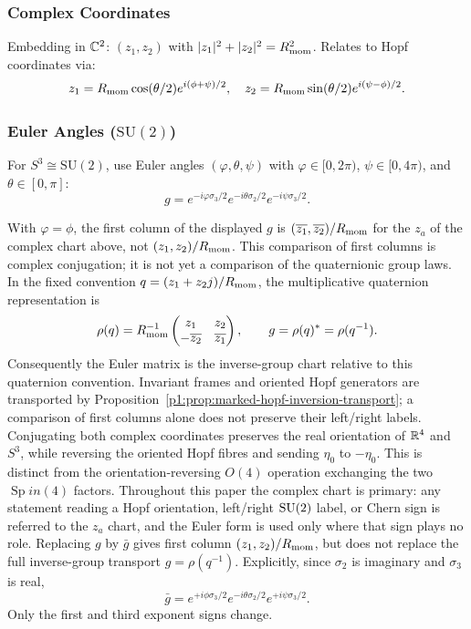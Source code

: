 \documentclass[11pt]{article}
\begin{document}
\subsubsection{Complex Coordinates}
Embedding in $\mathbb{C}^2$: $(z_1, z_2)$ with $|z_1|^2 + |z_2|^2 = R_{\mathrm{mom}}^2$. Relates to Hopf coordinates via:
\[
z_1 = R_{\mathrm{mom}}\cos(\theta/2)e^{i(\phi+\psi)/2}, \quad z_2 = R_{\mathrm{mom}}\sin(\theta/2)e^{i(\psi-\phi)/2}.
\]

\subsubsection{\texorpdfstring{Euler Angles ($\mathrm{SU}(2)$)}{Euler Angles (SU(2))}}
For $S^3 \cong \mathrm{SU}(2)$, use Euler angles $(\varphi,\theta,\psi)$ with $\varphi\in [0,2\pi)$, $\psi\in[0,4\pi)$, and $\theta \in [0,\pi]$:
\[
g = e^{-i\varphi\sigma_3/2}e^{-i\theta\sigma_2/2}e^{-i\psi\sigma_3/2}.
\]
\begin{remark}
\label{p1:rem:euler-complex-dictionary}
With \(\varphi=\phi\), the first column of the displayed \(g\) is
\((\overline{z_1},\overline{z_2})/R_{\mathrm{mom}}\) for the \(z_a\) of the complex chart
above, not \((z_1,z_2)/R_{\mathrm{mom}}\).  This comparison of first columns
is complex conjugation; it is not yet a comparison of the quaternionic
group laws.  In the fixed convention \(q=(z_1+z_2j)/R_{\mathrm{mom}}\), the
multiplicative quaternion representation is
\[
 \rho(q)=R_{\mathrm{mom}}^{-1}
 \begin{pmatrix}z_1&z_2\\-\overline{z_2}&\overline{z_1}\end{pmatrix},
 \qquad g=\rho(q)^*=\rho(q^{-1}).
\]
Consequently the Euler matrix is the inverse-group chart relative to this
quaternion convention.  Invariant frames and oriented Hopf generators are
transported by Proposition~\ref{p1:prop:marked-hopf-inversion-transport};
a comparison of first columns alone does not preserve their left/right
labels.  Conjugating both complex coordinates preserves the
real orientation of \(\mathbb{R}^4\) and \(S^3\), while reversing the oriented Hopf
fibres and sending \(\eta_0\) to \(-\eta_0\).  This is distinct from the
orientation-reversing \(O(4)\) operation exchanging the two \(\operatorname{Sp}in(4)\)
factors.  Throughout this paper
the complex chart is primary: any statement reading a Hopf orientation,
left/right \(\mathrm{SU}(2)\) label, or Chern sign is referred to the \(z_a\) chart,
and the Euler form is used only where that sign plays no role.  Replacing
\(g\) by \(\bar g\) gives first column \((z_1,z_2)/R_{\mathrm{mom}}\), but does not
replace the full inverse-group transport \(g=\rho(q^{-1})\).  Explicitly,
since \(\sigma_2\) is imaginary and \(\sigma_3\) is real,
\[
 \bar g
 =e^{+i\phi\sigma_3/2}e^{-i\theta\sigma_2/2}e^{+i\psi\sigma_3/2}.
\]
Only the first and third exponent signs change.
\end{remark}
\end{document}
